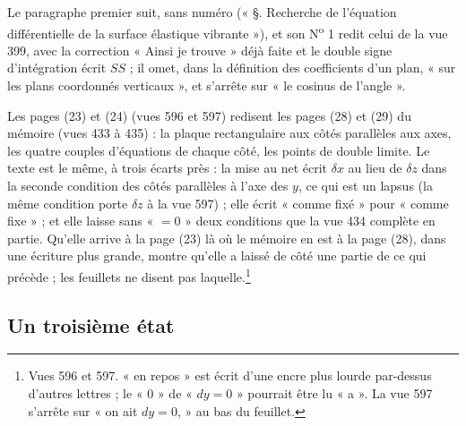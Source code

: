 \documentclass[11pt,a4paper]{article}
\begin{document}
Le paragraphe premier suit, sans numéro (« §. Recherche de l'équation différentielle
de la surface élastique vibrante »), et son N\textsuperscript{o} 1 redit celui de la
vue 399, avec la correction « Ainsi je trouve » déjà faite et le double signe
d'intégration écrit $SS$ ; il omet, dans la définition des coefficients d'un plan,
« sur les plans coordonnés verticaux », et s'arrête sur « le cosinus de l'angle ».

Les pages (23) et (24) (vues 596 et 597) redisent les pages (28) et (29) du mémoire
(vues 433 à 435) : la plaque rectangulaire aux côtés parallèles aux axes, les quatre
couples d'équations de chaque côté, les points de double limite. Le texte est le même,
à trois écarts près : la mise au net écrit $\delta x$ au lieu de $\delta z$ dans la
seconde condition des côtés parallèles à l'axe des $y$, ce qui est un lapsus (la même
condition porte $\delta z$ à la vue 597) ; elle écrit « comme fixé » pour « comme
fixe » ; et elle laisse sans « $= 0$ » deux conditions que la vue 434 complète en
partie. Qu'elle arrive à la page (23) là où le mémoire en est à la page (28), dans une
écriture plus grande, montre qu'elle a laissé de côté une partie de ce qui précède ;
les feuillets ne disent pas laquelle.\footnote{Vues 596 et 597. « en repos » est écrit
d'une encre plus lourde par-dessus d'autres lettres ; le « 0 » de « $dy = 0$ » pourrait
être lu « a ». La vue 597 s'arrête sur « on ait $dy = 0$, » au bas du feuillet.}

\subsection*{Un troisième état}
\end{document}
